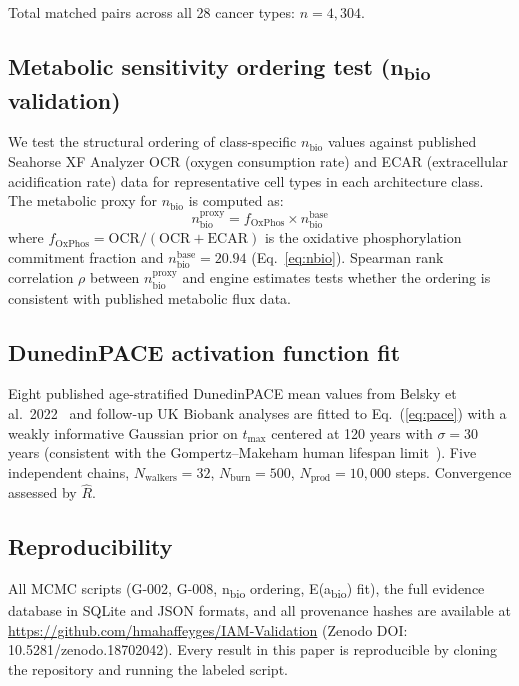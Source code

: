 \documentclass[12pt,a4paper]{article}
\newcommand{\nbio}{n_{\mathrm{bio}}}
\begin{document}
Total matched pairs across all 28 cancer types: $n = 4{,}304$.

\subsection{Metabolic sensitivity ordering test (n\textsubscript{bio} validation)}
\label{sec:nbio_methods}
\label{sec:nbio_validation}


We test the structural ordering of class-specific $\nbio$ values against
published Seahorse XF Analyzer OCR (oxygen consumption rate) and ECAR
(extracellular acidification rate) data for representative cell types in
each architecture class. The metabolic proxy for $\nbio$ is computed as:
\begin{equation}
  \nbio^{\mathrm{proxy}} = f_{\mathrm{OxPhos}} \times \nbio^{\mathrm{base}}
  \label{eq:nbio_proxy}
\end{equation}
where $f_{\mathrm{OxPhos}} = \mathrm{OCR}/(\mathrm{OCR} + \mathrm{ECAR})$
is the oxidative phosphorylation commitment fraction and $\nbio^{\mathrm{base}} =
20.94$ (Eq.~\ref{eq:nbio}). Spearman rank correlation $\rho$ between
$\nbio^{\mathrm{proxy}}$ and engine estimates tests whether the ordering is
consistent with published metabolic flux data.

\subsection{DunedinPACE activation function fit}
\label{sec:eabio_methods}

Eight published age-stratified DunedinPACE mean values from Belsky et al.\
2022~\cite{Belsky2022} and follow-up UK Biobank analyses are fitted to
Eq.~(\ref{eq:pace}) with a weakly informative Gaussian prior on $t_{\max}$
centered at 120 years with $\sigma = 30$ years (consistent with the
Gompertz--Makeham human lifespan limit~\cite{Gompertz1825,Makeham1860}).
Five independent chains, $N_{\mathrm{walkers}} = 32$, $N_{\mathrm{burn}} = 500$,
$N_{\mathrm{prod}} = 10{,}000$ steps. Convergence assessed by $\hat{R}$.

\subsection{Reproducibility}
All MCMC scripts (G-002, G-008, n\textsubscript{bio} ordering, E(a\textsubscript{bio}) fit),
the full evidence database in SQLite and JSON formats, and all provenance hashes
are available at \url{https://github.com/hmahaffeyges/IAM-Validation}
(Zenodo DOI: 10.5281/zenodo.18702042). Every result in this paper is
reproducible by cloning the repository and running the labeled script.
\end{document}
